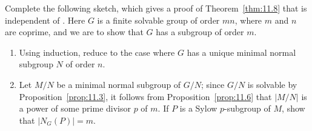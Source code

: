 \documentclass[../Odyssey_Project.tex]{subfiles}
\begin{document}
\begin{exercise}
\label{ex:11.3}
Complete the following sketch, which gives a proof of Theorem~\ref{thm:11.8} that is independent of . Here $G$ is a finite solvable group of order $mn$, where $m$ and $n$ are coprime, and we are to show that $G$ has a subgroup of order $m$.
\begin{enumerate}
    \item[(a)] Using induction, reduce to the case where $G$ has a unique minimal normal subgroup $N$ of order $n$.
    \item[(b)] Let $M/N$ be a minimal normal subgroup of $G/N$; since $G/N$ is solvable by Proposition~\ref{prop:11.3}, it follows from Proposition~\ref{prop:11.6} that $|M/N|$ is a power of some prime divisor $p$ of $m$. If $P$ is a Sylow $p$-subgroup of $M$, show that $|N_G(P)| = m$.
\end{enumerate}
\end{exercise}
\end{document}
